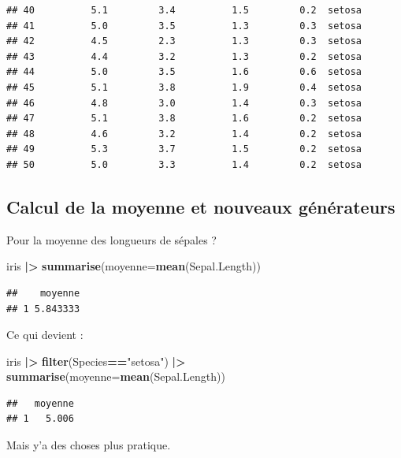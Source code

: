 \documentclass[
]{book}
\newenvironment{Shaded}{\begin{snugshade}}{\end{snugshade}}
\newcommand{\AttributeTok}[1]{\textcolor[rgb]{0.13,0.29,0.53}{#1}}
\newcommand{\FunctionTok}[1]{\textcolor[rgb]{0.13,0.29,0.53}{\textbf{#1}}}
\newcommand{\NormalTok}[1]{#1}
\newcommand{\SpecialCharTok}[1]{\textcolor[rgb]{0.81,0.36,0.00}{\textbf{#1}}}
\newcommand{\StringTok}[1]{\textcolor[rgb]{0.31,0.60,0.02}{#1}}
\begin{document}
\begin{verbatim}
## 40          5.1         3.4          1.5         0.2  setosa
## 41          5.0         3.5          1.3         0.3  setosa
## 42          4.5         2.3          1.3         0.3  setosa
## 43          4.4         3.2          1.3         0.2  setosa
## 44          5.0         3.5          1.6         0.6  setosa
## 45          5.1         3.8          1.9         0.4  setosa
## 46          4.8         3.0          1.4         0.3  setosa
## 47          5.1         3.8          1.6         0.2  setosa
## 48          4.6         3.2          1.4         0.2  setosa
## 49          5.3         3.7          1.5         0.2  setosa
## 50          5.0         3.3          1.4         0.2  setosa
\end{verbatim}

\subsection{Calcul de la moyenne et nouveaux générateurs}\label{calcul-de-la-moyenne-et-nouveaux-guxe9nuxe9rateurs}

Pour la moyenne des longueurs de sépales ?

\begin{Shaded}
\begin{Highlighting}[]
\NormalTok{iris }\SpecialCharTok{|\textgreater{}} \FunctionTok{summarise}\NormalTok{(}\AttributeTok{moyenne=}\FunctionTok{mean}\NormalTok{(Sepal.Length))  }
\end{Highlighting}
\end{Shaded}

\begin{verbatim}
##    moyenne
## 1 5.843333
\end{verbatim}

Ce qui devient :

\begin{Shaded}
\begin{Highlighting}[]
\NormalTok{iris }\SpecialCharTok{|\textgreater{}} \FunctionTok{filter}\NormalTok{(Species}\SpecialCharTok{==}\StringTok{"setosa"}\NormalTok{) }\SpecialCharTok{|\textgreater{}} \FunctionTok{summarise}\NormalTok{(}\AttributeTok{moyenne=}\FunctionTok{mean}\NormalTok{(Sepal.Length))}
\end{Highlighting}
\end{Shaded}

\begin{verbatim}
##   moyenne
## 1   5.006
\end{verbatim}

Mais y'a des choses plus pratique.
\end{document}
